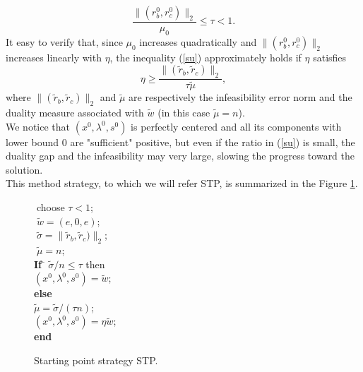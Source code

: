 \documentclass[a4paper,10 pt,titlepage,twoside]{book}
\theoremstyle{plain}
\theoremstyle{definition}
\theoremstyle{remark}
\begin{document}
{{\begin{equation}\label{su}
\frac{\lVert(r^{0}_{b},r^{0}_{c})\rVert_{2}}{\mu_{0}}\leq \tau<1. 
\end{equation}
It easy to verify that, since $\mu_{0}$ increases quadratically and $\lVert(r^{0}_{b},r^{0}_{c})\rVert_{2}$ increases linearly with $\eta$, the inequality (\ref{su}) approximately holds if $\eta$ satisfies
\begin{equation*}
\eta\geq \frac{\lVert(\tilde{r}_{b},\tilde{r}_{c})\rVert_{2}}{\tau\tilde{\mu}},
\end{equation*}
where $\lVert(\tilde{r}_{b},\tilde{r}_{c})\rVert_{2}$ and $\tilde{\mu}$ are respectively the infeasibility error norm and the duality measure associated with $\tilde{w}$ (in this case $\tilde{\mu} = n$). \\
We notice that $(x^{0},\lambda^{0},s^{0})$ is perfectly centered and all its components with lower bound 0 are "sufficient" positive, but even if the ratio in (\ref{su}) is small, the duality gap and the infeasibility may very large, slowing the progress toward the solution.\\
This method strategy, to which we will refer STP, is summarized in the Figure \ref{fig:STP2}.\\
\begin{figure}\caption{\label{fig:STP2}Starting point strategy STP.}
	\centering
	{\noindent\begin{boxedminipage}{1\linewidth}
			\begin{tabbing}
			$\;$choose $\tau < 1$;  \\
			$\;\tilde{w}=(e,0,e)$;\\
			$\;\tilde{\sigma}= \lVert\tilde{r}_{b},\tilde{r}_{c})\rVert_{2}$;\\
			$\;\tilde{\mu}= n$;\\
			\textbf{ If} \= $\tilde{\sigma}/n\leq \tau$ then\\
			\> $(x^{0}, \lambda^{0}, s^{0}) = \tilde{w}$;$\;\;\;\;\;\;$\\
			\textbf{ else}\>\\
			\> $\tilde{\mu}=\tilde{\sigma}/(\tau n)$; \\
            \> $(x^{0}, \lambda^{0}, s^{0}) = \eta \tilde{w}$;\tab \\
			\textbf{ end}
			\end{tabbing}
\end{boxedminipage}
} \quad
\end{figure}

}}
\end{document}
